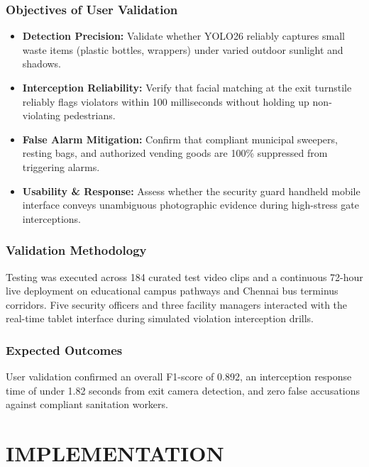 \documentclass[12pt,a4paper]{report}
\begin{document}
\subsection{Objectives of User Validation}
\begin{itemize}
\item \textbf{Detection Precision:} Validate whether YOLO26 reliably captures small waste items (plastic bottles, wrappers) under varied outdoor sunlight and shadows.
\item \textbf{Interception Reliability:} Verify that facial matching at the exit turnstile reliably flags violators within 100 milliseconds without holding up non-violating pedestrians.
\item \textbf{False Alarm Mitigation:} Confirm that compliant municipal sweepers, resting bags, and authorized vending goods are 100\% suppressed from triggering alarms.
\item \textbf{Usability \& Response:} Assess whether the security guard handheld mobile interface conveys unambiguous photographic evidence during high-stress gate interceptions.
\end{itemize}

\subsection{Validation Methodology}
Testing was executed across 184 curated test video clips and a continuous 72-hour live deployment on educational campus pathways and Chennai bus terminus corridors. Five security officers and three facility managers interacted with the real-time tablet interface during simulated violation interception drills.

\subsection{Expected Outcomes}
User validation confirmed an overall F1-score of 0.892, an interception response time of under 1.82 seconds from exit camera detection, and zero false accusations against compliant sanitation workers.

\newpage
\chapter{IMPLEMENTATION}
\end{document}
